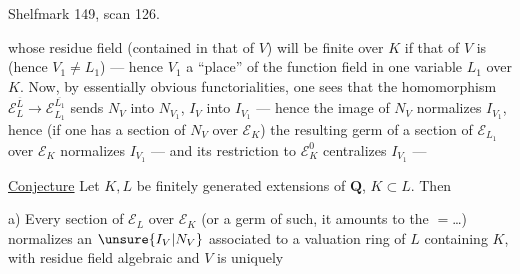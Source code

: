 Shelfmark 149, scan 126.

whose residue field (contained in that of $V$) will be  finite over $K$ if that of $V$ is (hence $V_1\ne L_1$) --- hence $V_1$ \deleted{$\longrightarrow$}  a ``place'' of the function field in one variable $L_1$ over $K$. Now, by essentially obvious functorialities, one sees that the homomorphism $\mathcal E_L^{\overline L}\longrightarrow\mathcal E_{L_1}^{\overline{L_1}}$ sends $N_V$ into $N_{V_1}$, $I_V$ into $I_{V_1}$ --- hence the image of $N_V$ normalizes $I_{V_1}$, hence (if one has a  section of $N_V$ over $\mathcal E_K$) the resulting germ of a section of $\mathcal E_{L_1}$ over $\mathcal E_K$ normalizes $I_{V_1}$ --- and its restriction to $\mathcal E_K^0$ centralizes $I_{V_1}$ ---

\uline{Conjecture} Let $K,L$ be finitely generated extensions of $\mathbf Q$, $K\subset L$. Then

a) Every section of $\mathcal E_L$ over $\mathcal E_K$ (or a germ of such, it amounts to the $=$\ldots) normalizes an $\unsure{I_V|N_V}$ associated to a valuation ring  of $L$ containing $K$, with residue field algebraic  \deleted{\unsure{,}} and  $V$ is uniquely
